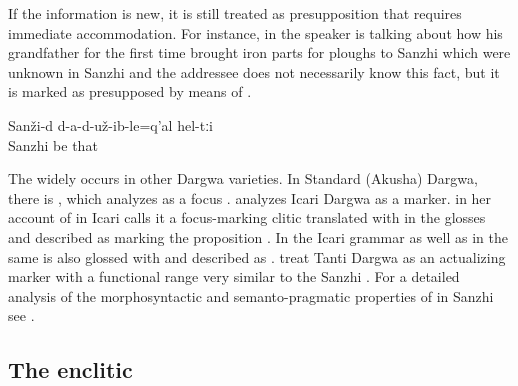 If the information is new, it is still treated as presupposition that requires immediate accommodation. For instance, in  the speaker is talking about how his grandfather for the first time brought iron parts for ploughs to Sanzhi which were unknown in Sanzhi and the addressee does not necessarily know this fact, but it is marked as presupposed by means of .

\begin{exe}
	\ex	\label{ex:In Sanzhi, they did not have them (the iron item that you use on wooden ploughs) minor}
	\gll	Sanži-d	d-a-d-už-ib-le=q'al	hel-tːi\\
		Sanzhi	be	that\\
	\glt	{}
\end{exe}

The   widely occurs in other Dargwa varieties. In Standard (Akusha) Dargwa, there is , which \citet[748]{vandenBerg2001} analyzes as a focus . \citet{Tatevosov2001} analyzes Icari Dargwa  as a  marker. \citet{Sumbatova2009} in her account of  in Icari calls it a focus-marking clitic translated with  in the glosses and described as marking the proposition . In the Icari grammar as well as in \citet{Kalinina.Sumbatova2007} the same  is also glossed with  and described as . \citet[338]{Sumbatova.Lander2014} treat Tanti Dargwa  as an actualizing marker with a functional range very similar to the Sanzhi . For a detailed analysis of the morphosyntactic and semanto-pragmatic properties of  in Sanzhi see \citet{ForkerSubmittedc}.



\subsection{The enclitic }
\label{ssec:The enclitic =q'ar}

